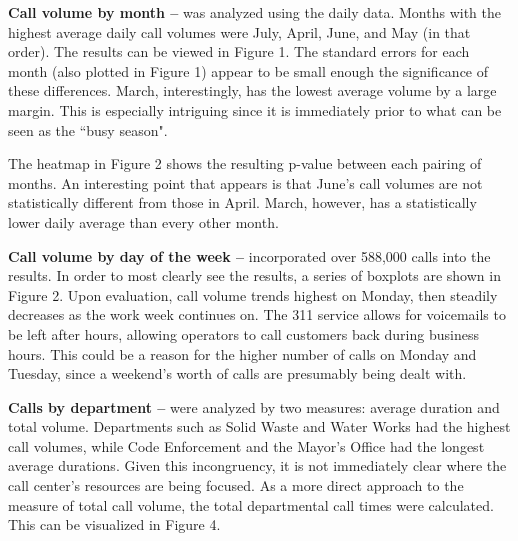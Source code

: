 \documentclass{article}
\begin{document}
\textbf{Call volume by month --} was analyzed using the daily data.  Months with the highest average daily call volumes were July, April, June, and May (in that order).  The results can be viewed in Figure 1.  The standard errors for each month (also plotted in Figure 1) appear to be small enough the significance of these differences.  March, interestingly, has the lowest average volume by a large margin.  This is especially intriguing since it is immediately prior to what can be seen as the ``busy season".

The heatmap in Figure 2 shows the resulting p-value between each pairing of months.  An interesting point that appears is that June's call volumes are not statistically different from those in April.  March, however, has a statistically lower daily average than every other month.
\par

\textbf{Call volume by day of the week --} incorporated over 588,000 calls into the results.  In order to most clearly see the results, a series of boxplots are shown in Figure 2.  Upon evaluation, call volume trends highest on Monday, then steadily decreases as the work week continues on.  The 311 service allows for voicemails to be left after hours, allowing operators to call customers back during business hours.  This could be a reason for the higher number of calls on Monday and Tuesday, since a weekend's worth of calls are presumably being dealt with.
\par

\textbf{Calls by department --} were analyzed by two measures:  average duration and total volume.  Departments such as Solid Waste and Water Works had the highest call volumes, while Code Enforcement and the Mayor's Office had the longest average durations.  Given this incongruency, it is not immediately clear where the call center's resources are being focused.  As a more direct approach to the measure of total call volume, the total departmental call times were calculated.  This can be visualized in Figure 4.
\par
\end{document}
